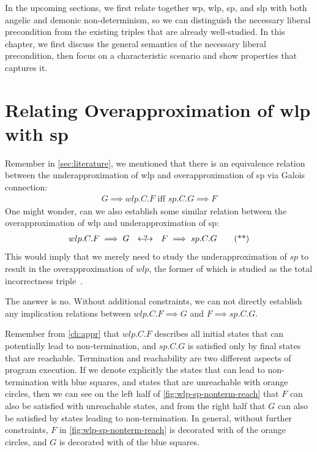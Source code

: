 In the upcoming sections, we first relate together wp, wlp, sp, and slp with both angelic and demonic non-determinism, so we can distinguish the necessary liberal precondition from the existing triples that are already well-studied. 
In this chapter, we first discuss the general semantics of the necessary liberal precondition, then focus on a characteristic scenario and show properties that captures it. 

\section{Relating Overapproximation of wlp with sp}\label{sec:negative}
Remember in \autoref{sec:literature}, we mentioned that there is an equivalence relation between the underapproximation of wlp and overapproximation of sp via Galois connection: 
\begin{align}
	G\implies wlp.C.F\text{ iff }sp.C.G\implies F \tag{*}
\end{align}
One might wonder, can we also establish some similar relation between the overapproximation of wlp and underapproximation of sp:  
\begin{align}
	wlp.C.F \implies G\ \  \rlap{\(\quad?\)}\longleftrightarrow \ \ F\implies sp.C.G \tag{**}
\end{align}
This would imply that we merely need to study the underapproximation of $sp$ to result in the overapproximation of $wlp$, the former of which is studied as the total incorrectness triple~\cite{ohearn2020IncorrectnessLogic}. 

The answer is no. 
Without additional constraints, we can not directly establish any implication relations between $wlp.C.F\implies G$ and $F\implies sp.C.G$. 

Remember from \autoref{ch:appr} that $wlp.C.F$ describes all initial states that can potentially lead to non-termination, and $sp.C.G$ is satisfied only by final states that are reachable. 
Termination and reachability are two different aspects of program execution. 
If we denote explicitly the states that can lead to non-termination with blue squares, and states that are unreachable with orange circles, then we can see on the left half of \autoref{fig:wlp-sp-nonterm-reach} that $F$ can also be satisfied with unreachable states, and from the right half that $G$ can also be satisfied by states leading to non-termination.
In general, without further constraints, $F$ in \autoref{fig:wlp-sp-nonterm-reach} is decorated with  of the orange circles, and $G$ is decorated with  of the blue squares. 

